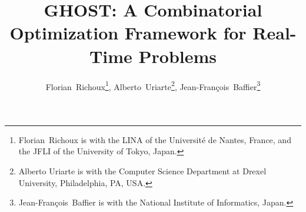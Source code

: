 \documentclass[journal]{IEEEtran}
\newcommand{\ghost}{\textsc{GHOST}\xspace}
\begin{document}


%
\title{\ghost: A Combinatorial Optimization Framework for Real-Time Problems}
%
%
%


\author{Florian~Richoux\thanks{Florian~Richoux is with the LINA of the Universit{\'e} de Nantes, France, and the JFLI of the University of Tokyo, Japan.},
        Alberto~Uriarte\thanks{Alberto  Uriarte is  with the  Computer
          Science Department  at Drexel University,  Philadelphia, PA,
          USA.},
        Jean-Fran{\c  c}ois~Baffier\thanks{Jean-Fran{\c  c}ois~Baffier
          is with the National Institute of Informatics, Japan.}}



% 
%
\end{document}
